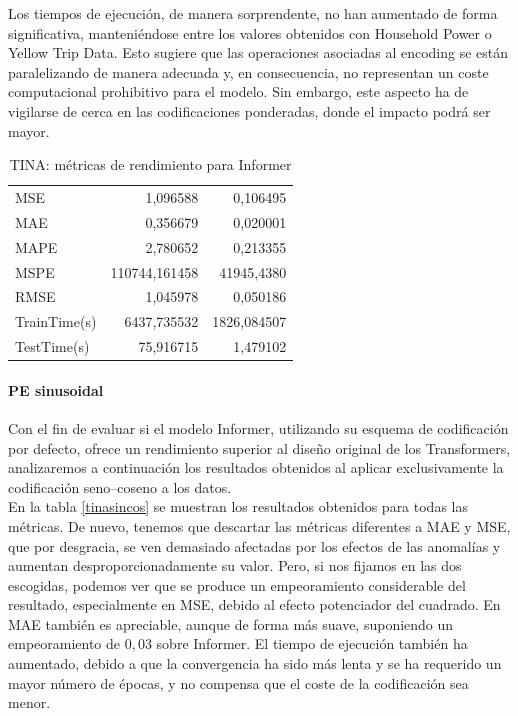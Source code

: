  Los tiempos de ejecución, de manera sorprendente, no han aumentado de forma significativa, manteniéndose entre los valores obtenidos con Household Power o Yellow Trip Data. Esto sugiere que las operaciones asociadas al encoding se están paralelizando de manera adecuada y, en consecuencia, no representan un coste computacional prohibitivo para el modelo. Sin embargo, este aspecto ha de vigilarse de cerca en las codificaciones ponderadas, donde el impacto podrá ser mayor.

\begin{table}[!ht]
	\centering
	\begin{tabular}{l|N|N}
		\toprule
		 &  &  \\
		\midrule
		MSE & 1,096588 & 0,106495 \\
		MAE & 0,356679 & 0,020001 \\
		MAPE & 2,780652 & 0,213355 \\
		MSPE & 110744,161458 & 41945,4380 \\
		RMSE & 1,045978 & 0,050186 \\
		TrainTime(s) & 6437,735532 & 1826,084507 \\
		TestTime(s) & 75,916715 & 1,479102 \\
		\bottomrule
	\end{tabular}
	\caption{TINA: métricas de rendimiento para Informer}
	\label{tinainformer}
\end{table}

\paragraph{PE sinusoidal}

Con el fin de evaluar si el modelo Informer, utilizando su esquema de codificación por defecto, ofrece un rendimiento superior al diseño original de los Transformers, analizaremos a continuación los resultados obtenidos al aplicar exclusivamente la codificación seno–coseno a los datos.\\

En la tabla \ref{tinasincos} se muestran los resultados obtenidos para todas las métricas. De nuevo, tenemos que descartar las métricas diferentes a MAE y MSE, que por desgracia, se ven demasiado afectadas por los efectos de las anomalías y aumentan desproporcionadamente su valor. Pero, si nos fijamos en las dos escogidas, podemos ver que se produce un empeoramiento considerable del resultado, especialmente en MSE, debido al efecto potenciador del cuadrado. En MAE también es apreciable, aunque de forma más suave, suponiendo un empeoramiento de $0,03$ sobre Informer. El tiempo de ejecución también ha aumentado, debido a que la convergencia ha sido más lenta y se ha requerido un mayor número de épocas, y no compensa que el coste de la codificación sea menor.

